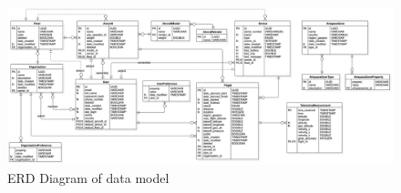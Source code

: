 \begin{figure}
    \centering
    \includegraphics[scale=0.3, angle=90]{assets/erd_diagram.png}
    \caption{ERD Diagram of data model}
    \label{fig:erd-diagram}
\end{figure}
